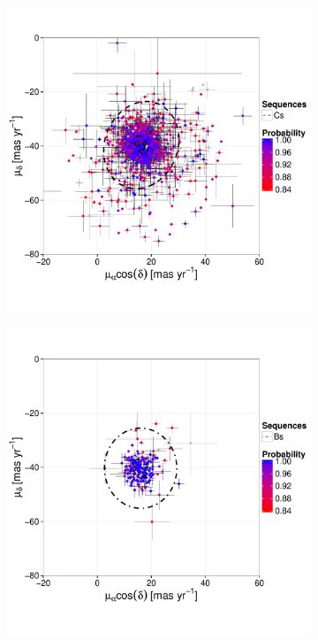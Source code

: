 \begin{figure}[ht!]
    \centering
    \begin{subfigure}[t]{0.45\textwidth}
       \includegraphics[page=1,width=\textwidth]{background/Figures/BHM/Cs_members.pdf}
    \end{subfigure}
    \begin{subfigure}[t]{0.45\textwidth}
     \includegraphics[page=1,width=\textwidth]{background/Figures/BHM/Bs_members.pdf}

\end{subfigure}
\end{figure}
